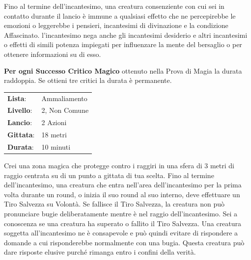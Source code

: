 \begin{multicols}{2}
Fino al termine dell'incantesimo, una creatura consenziente con cui sei in contatto durante il lancio è immune a qualsiasi effetto che ne percepirebbe le emozioni o leggerebbe i pensieri, incantesimi di divinazione e la condizione Affascinato. l'incantesimo nega anche gli incantesimi desiderio e altri incantesimi o effetti di simili potenza impiegati per
influenzare la mente del bersaglio o per ottenere informazioni su di esso.

\textbf{Per ogni Successo Critico Magico} ottenuto nella Prova di Magia la durata raddoppia. Se ottieni tre critici la durata è permanente.

\noindent\begin{tabularx}{\linewidth}{p{1.3cm}X}
	\rowcolor{gray!20}\textbf{Lista}: & Ammaliamento \\
	\textbf{Livello}: & 2, Non Comune \\
	\rowcolor{gray!20}\textbf{Lancio}: & 2 Azioni \\
	\textbf{Gittata}: & 18 metri \\
	\rowcolor{gray!20}\textbf{Durata}: & 10 minuti \\
\end{tabularx}\smallskip

Crei una zona magica che protegge contro i raggiri in una sfera di 3 metri di raggio centrata su di un punto a gittata di tua scelta. Fino al termine dell'incantesimo, una creatura che entra nell'area dell'incantesimo per la prima volta durante un round, o inizia il suo round al suo interno, deve effettuare un Tiro Salvezza su Volontà. Se fallisce il Tiro Salvezza, la creatura non può pronunciare bugie deliberatamente mentre è nel raggio dell'incantesimo. Sei a conoscenza se una creatura ha superato o fallito il Tiro Salvezza. Una creatura soggetta all'incantesimo ne è consapevole e può quindi evitare di rispondere a domande a cui risponderebbe normalmente con una bugia. Questa creatura può dare risposte elusive purché rimanga entro i confini della verità.


\bigskip


\end{multicols}

